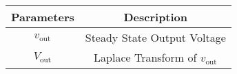 \begin{tabular}{|c|c|}
\hline
    Parameters & Description \\\hline
    $v_{\text{out}}$  & Steady State Output Voltage  \\\hline
    $V_{\text{out}}$ & Laplace Transform of $v_{\text{out}}$\\\hline
\end{tabular}
